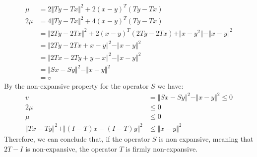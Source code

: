 \documentclass[]{article}
\begin{document}
        \begin{align*}\tag{3c2}\label{eqn:3c2}
            \mu &= 2 \Vert Ty - Tx\Vert^2
            + 2(x - y)^T(Ty - T x)
            \\
            2\mu &= 4 \Vert Ty - Tx\Vert^2 
            + 4(x - y)^T(Ty - T x)
            \\
            &= \Vert 2Ty - 2Tx\Vert^2 + 2(x - y)^T(2Ty - 2Tx) + \Vert x - y^2 \Vert - \Vert x - y\Vert^2
            \\
            &= \Vert 2Ty - 2Tx + x - y\Vert^2 - \Vert x - y\Vert^2
            \\
            & =\Vert 2Tx - 2Ty + y - x\Vert^2 - \Vert x - y\Vert^2
            \\
            &= \Vert Sx - Sy\Vert^2 - \Vert x - y\Vert^2
            \\
            &= v
        \end{align*}
        By the non-expansive property for the operator $S$ we have: 
        \begin{align*}\tag{3c3}\label{eqn:3c3}
            v &= \Vert Sx - Sy \Vert^2 - \Vert x - y \Vert^2 \le 0
            \\
            2\mu &\le 0
            \\
            \mu &\le 0
            \\
            \Vert Tx - Ty\Vert^2 + \Vert (I - T)x - (I - T)y\Vert^2 &\le  \Vert x - y\Vert^2
        \end{align*}
        Therefore, we can conclude that, if the operator $S$ is non expansive, meaning that $2T -I$ is non-expansive, the operator $T$ is firmly non-expansive. 

        
\end{document}
